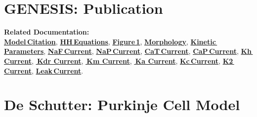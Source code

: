 \documentclass[12pt]{article}
\begin{document}
\section*{GENESIS: Publication}

{\bf Related Documentation:}\\

\noindent \href{../pub-purkinje-deschutter1-citation/pub-purkinje-deschutter1-citation.tex}{\bf Model\,Citation}, 
\href{../pub-purkinje-deschutter1-equations1/pub-purkinje-deschutter1-equations1.tex}{\bf HH\,Equations},
\href{../pub-purkinje-deschutter1-fig-1/pub-purkinje-deschutter1-fig-1.tex}{\bf Figure\,1},
\href{../pub-purkinje-deschutter1-morphology/pub-purkinje-deschutter1-morphology.tex}{\bf Morphology},
\href{../pub-purkinje-deschutter1-table1/pub-purkinje-deschutter1-table1.tex}{\bf Kinetic\,Parameters},
\href{../pub-purkinje-deschutter1-conductance1-naf1/pub-purkinje-deschutter1-conductance1-naf1.tex}{\bf NaF\,Current},
\href{../pub-purkinje-deschutter1-conductance1-nap1/pub-purkinje-deschutter1-conductance1-nap1.tex}{\bf NaP\,Current},
\href{../pub-purkinje-deschutter1-conductance1-cat1/pub-purkinje-deschutter1-conductance1-cat1.tex}{\bf CaT\,Current},
\href{../pub-purkinje-deschutter1-conductance1-cap1/pub-purkinje-deschutter1-conductance1-cap1.tex}{\bf CaP\,Current},
\href{../pub-purkinje-deschutter1-conductance1-kh1/pub-purkinje-deschutter1-conductance1-kh1.tex}{\bf Kh\,Current},
\href{../pub-purkinje-deschutter1-conductance1-kdr1/pub-purkinje-deschutter1-conductance1-kdr1.tex}{\bf\,Kdr Current},
\href{../pub-purkinje-deschutter1-conductance1-km1/pub-purkinje-deschutter1-conductance1-km1.tex}{\bf\,Km Current},
\href{../pub-purkinje-deschutter1-conductance1-ka1/pub-purkinje-deschutter1-conductance1-ka1.tex}{\bf\,Ka Current},
\href{../pub-purkinje-deschutter1-conductance1-kc1/pub-purkinje-deschutter1-conductance1-kc1.tex}{\bf Kc\,Current},
\href{../pub-purkinje-deschutter1-conductance1-k2/pub-purkinje-deschutter1-conductance1-k2.tex}{\bf K2\,Current},
\href{../pub-purkinje-deschutter1-conductance1-leak1/pub-purkinje-deschutter1-conductance1-leak1.tex}{\bf Leak\,Current}.

\section*{De Schutter: Purkinje Cell Model}
\end{document}
